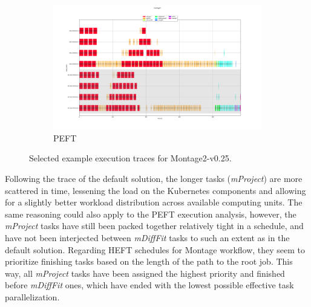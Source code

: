 \begin{figure}[H]
    \begin{subfigure}{1\textwidth}
        \centering
        \includegraphics[width=0.75\linewidth]{figures/6-1-m0.25-peft.png}
        \caption[Selected example execution traces for Montage2-v0.25 workflow with PEFT]{PEFT}
        \label{fig:evaluation:sched:m025:peft}
    \end{subfigure}
    \centering
    \caption[Selected example execution traces for Montage2-v0.25 workflow]{Selected example execution traces for Montage2-v0.25.}
    \label{fig:evaluation:sched:m025:plugin}
\end{figure} %
\noindent
Following the trace of the default solution, the longer tasks (\emph{mProject}) are more scattered in time, lessening the load on the Kubernetes components and allowing for a slightly better workload distribution across available computing units.
The same reasoning could also apply to the PEFT execution analysis, however, the \emph{mProject} tasks have still been packed together relatively tight in a schedule, and have not been interjected between \emph{mDiffFit} tasks to such an extent as in the default solution.
Regarding HEFT schedules for Montage workflow, they seem to prioritize finishing tasks based on the length of the path to the root job.
This way, all \emph{mProject} tasks have been assigned the highest priority and finished before \emph{mDiffFit} ones, which have ended with the lowest possible effective task parallelization.

